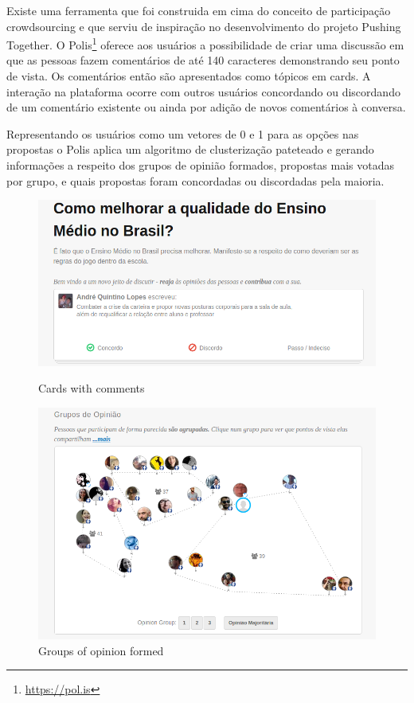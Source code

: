 \documentclass{llncs}
\begin{document}
 Existe uma ferramenta que foi construida em cima do conceito de participação
 crowdsourcing e que serviu de inspiração no desenvolvimento do projeto Pushing
 Together. O Polis\footnote{\url{https://pol.is}} oferece aos usuários a possibilidade
 de criar uma discussão em que as pessoas fazem comentários de
 até 140 caracteres demonstrando seu ponto de vista. Os comentários então são
 apresentados como tópicos em cards. A interação na plataforma ocorre com outros
 usuários concordando ou discordando de um comentário existente ou ainda por
 adição de novos comentários à conversa.

 Representando os usuários como um vetores de 0 e 1 para as opções nas propostas
 o Polis aplica um algoritmo de clusterização pateteado e gerando informações
 a respeito dos grupos de opinião formados, propostas mais votadas por grupo, e
 quais propostas foram concordadas ou discordadas pela maioria.

  \begin{figure}[H]
    \centering
      \begin{minipage}{.50\textwidth}
        \includegraphics[width=.9\linewidth]{images/polis1.png}
        \caption{Cards with comments}
        \label{fig:polis-2}
      \end{minipage}
      \begin{minipage}{.49\textwidth}
        \includegraphics[width=.9\linewidth]{images/polis2.png}
        \caption{Groups of opinion formed}
        \label{fig:polis-1}
      \end{minipage}
  \end{figure}
\end{document}
